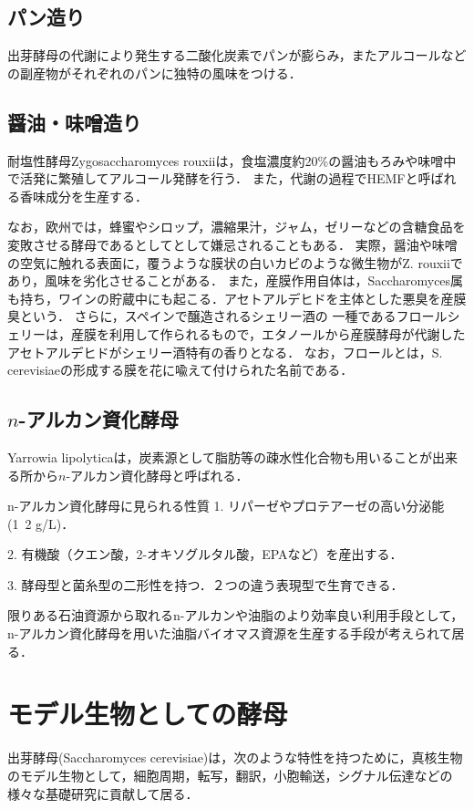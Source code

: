\documentclass[uplatex, dvipdfmx]{jsarticle}
\begin{document}
\subsection{パン造り}

出芽酵母の代謝により発生する二酸化炭素でパンが膨らみ，またアルコールなどの副産物がそれぞれのパンに独特の風味をつける．

\subsection{醤油・味噌造り}

耐塩性酵母Zygosaccharomyces rouxiiは，食塩濃度約20\%の醤油もろみや味噌中で活発に繁殖してアルコール発酵を行う．
また，代謝の過程でHEMFと呼ばれる香味成分を生産する．

なお，欧州では，蜂蜜やシロップ，濃縮果汁，ジャム，ゼリーなどの含糖食品を変敗させる酵母であるとしてとして嫌忌されることもある．
実際，醤油や味噌の空気に触れる表面に，覆うような膜状の白いカビのような微生物がZ. rouxiiであり，風味を劣化させることがある．
また，産膜作用自体は，Saccharomyces属も持ち，ワインの貯蔵中にも起こる．アセトアルデヒドを主体とした悪臭を産膜臭という．
さらに，スペインで醸造されるシェリー酒の
一種であるフロールシェリーは，産膜を利用して作られるもので，エタノールから産膜酵母が代謝したアセトアルデヒドがシェリー酒特有の香りとなる．
なお，フロールとは，S. cerevisiaeの形成する膜を花に喩えて付けられた名前である．

\subsection{$n$-アルカン資化酵母}

Yarrowia lipolyticaは，炭素源として脂肪等の疎水性化合物も用いることが出来る所から$n$-アルカン資化酵母と呼ばれる．
\begin{itembox}[l]{n-アルカン資化酵母に見られる性質}
    1. リパーゼやプロテアーゼの高い分泌能(1~2 g/L)．

    2. 有機酸（クエン酸，2-オキソグルタル酸，EPAなど）を産出する．

    3. 酵母型と菌糸型の二形性を持つ．２つの違う表現型で生育できる．
\end{itembox}

限りある石油資源から取れるn-アルカンや油脂のより効率良い利用手段として，
n-アルカン資化酵母を用いた油脂バイオマス資源を生産する手段が考えられて居る．

\section{モデル生物としての酵母}
出芽酵母(Saccharomyces cerevisiae)は，次のような特性を持つために，真核生物のモデル生物として，細胞周期，転写，翻訳，小胞輸送，シグナル伝達などの様々な基礎研究に貢献して居る．
\end{document}
